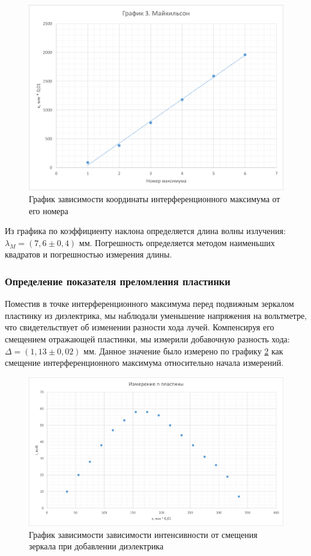\begin{figure}[H]
    \centering
    \includegraphics[scale=0.7]{pic/plot3.png}
    \caption{График зависимости координаты интерференционного максимума от его номера}
    \label{fig:plot3}
\end{figure}

Из графика по коэффициенту наклона определяется длина волны излучения: $\lambda_M = (7,6 \pm 0,4) \text{ мм}$. Погрешность определяется методом наименьших квадратов и погрешностью измерения длины.

\subsubsection{Определение показателя преломления пластинки}
Поместив в точке интерференционного максимума перед подвижным зеркалом пластинку из диэлектрика, мы наблюдали уменьшение напряжения на вольтметре, что свидетельствует об изменении разности хода лучей. Компенсируя его смещением отражающей пластинки, мы измерили добавочную разность хода: $\Delta = (1,13 \pm 0,02)\text{ мм}$. Данное значение было измерено по графику \ref{fig:plot4} как смещение интерференционного максимума относительно начала измерений.

\begin{figure}[H]
    \centering
    \includegraphics[scale=0.7]{pic/plot4.png}
    \caption{График зависимости зависимости интенсивности от смещения зеркала при добавлении диэлектрика}
    \label{fig:plot4}
\end{figure}

